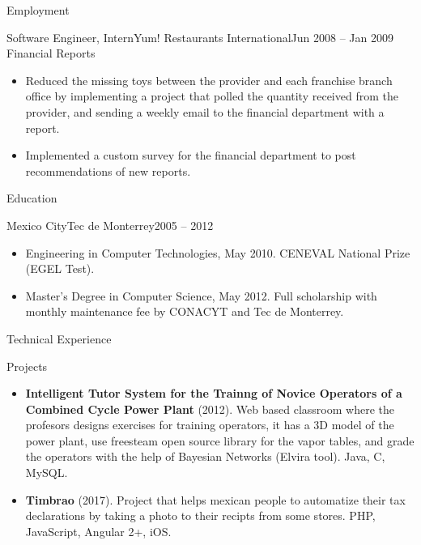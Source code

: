 \documentclass[]{mcdowellcv}
\begin{document}
\begin{cvsection}{Employment}
		\begin{cvsubsection}{Software Engineer, Intern}{Yum! Restaurants International}{Jun 2008 -- Jan 2009}
			Financial Reports			
			\begin{itemize}
				\item Reduced the missing toys between the provider and each franchise branch office by implementing a project that polled the quantity received from the provider, and sending a weekly email to the financial department with a report.
				\item Implemented a custom survey for the financial department to post recommendations of new reports.
			\end{itemize}
		\end{cvsubsection}
	\end{cvsection}
	
	\begin{cvsection}{Education}
		\begin{cvsubsection}{Mexico City}{Tec de Monterrey}{2005 -- 2012}
			\begin{itemize}
				\item Engineering in Computer Technologies, May 2010. CENEVAL National Prize (EGEL Test).
				\item Master's Degree in Computer Science, May 2012. Full scholarship with monthly maintenance fee by CONACYT and Tec de Monterrey.
			\end{itemize}
		\end{cvsubsection}
	\end{cvsection}
	
	\begin{cvsection}{Technical Experience}
		\begin{cvsubsection}{Projects}{}{}
			\begin{itemize}
				\item \textbf{Intelligent Tutor System for the Trainng of Novice Operators of a Combined Cycle Power Plant} (2012). Web based classroom where the profesors designs exercises for training operators, it has a 3D model of the power plant, use freesteam open source library for the vapor tables, and grade the operators with the help of Bayesian Networks (Elvira tool). Java, C, MySQL.
				\item \textbf{Timbrao} (2017). Project that helps mexican people to automatize their tax declarations by taking a photo to their recipts from some stores.  PHP, JavaScript, Angular 2+, iOS.
			\end{itemize}
		\end{cvsubsection}
	\end{cvsection}
	
\end{document}
